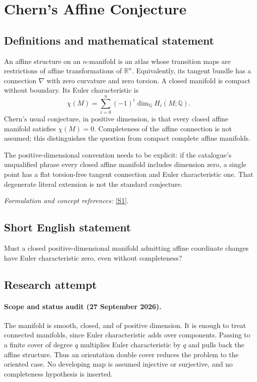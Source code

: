 \documentclass[11pt]{article}
\begin{document}
\section*{\texorpdfstring{Chern's Affine Conjecture}{Chern's Affine Conjecture}}\label{statement}
\subsection{Definitions and mathematical statement}
An affine structure on an $n$-manifold is an atlas whose transition maps are restrictions of affine transformations of ${\mathbb{R}}^n$. Equivalently, its tangent bundle has a connection $\nabla$ with zero curvature and zero torsion. A closed manifold is compact without boundary. Its Euler characteristic is
\[
 \chi(M)=\sum_{i=0}^n(-1)^i\dim_{{\mathbb{Q}}} H_i(M;{\mathbb{Q}}).
\]
Chern's usual conjecture, in positive dimension, is that every closed affine manifold satisfies $\chi(M)=0$. Completeness of the affine connection is not assumed; this distinguishes the question from compact complete affine manifolds.

The positive-dimensional convention needs to be explicit: if the catalogue's unqualified phrase every closed affine manifold includes dimension zero, a single point has a flat torsion-free tangent connection and Euler characteristic one. That degenerate literal extension is not the standard conjecture.
\par\smallskip\textit{Formulation and concept references:} \href{https://link.springer.com/article/10.1007/s41884-026-00193-8}{[S1]}.

\subsection{Short English statement}
Must a closed positive-dimensional manifold admitting affine coordinate changes have Euler characteristic zero, even without completeness?
\subsection{Research attempt}

\paragraph{Scope and status audit (27 September 2026).}
The manifold is smooth, closed, and of positive dimension. It is enough to
treat connected manifolds, since Euler characteristic adds over components.
Passing to a finite cover of degree $q$ multiplies Euler characteristic by
$q$ and pulls back the affine structure. Thus an orientation double cover
reduces the problem to the oriented case. No developing map is assumed
injective or surjective, and no completeness hypothesis is inserted.
\end{document}
